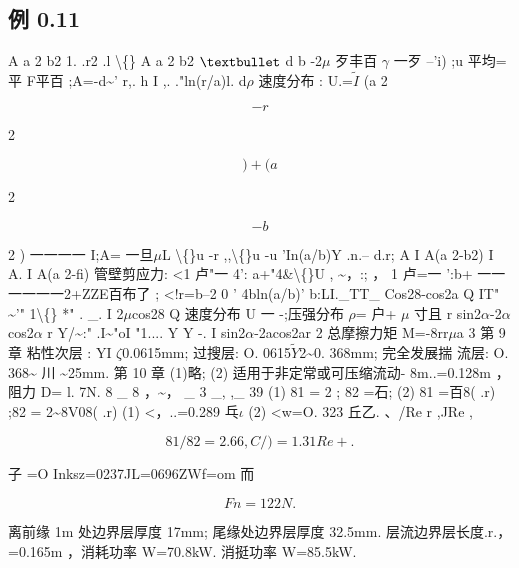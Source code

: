 \subsection*{例 0.11}

A a 2 b2 1. .r2 .l \textbackslash\{\} A a 2 b2 ${\rm •}$ d b -2$\mu$ 歹丰百 $\gamma$ 一歹 --'i) ;u 平均=平 F平百 ;A=-d\textasciitilde{}' r,. h I ,. ."ln(r/a)l. d$\rho$ 速度分布 : U.=$\tilde{I}$ (a 2

\[-r\]

2

\[)+(a\]

2

\[-b\]

2 ) 一一一一 I;A= 一旦$\mu$L \textbackslash\{\}u -r ,,\textbackslash\{\}u -u 'In(a/b)Y .n.-- d.r; A I A(a 2-b2) I A. I A(a 2-fi) 管壁剪应力: <1 卢"一 4': a+"4\&\textbackslash\{\}U , \textasciitilde{}，:; ， 1 卢=一 ':b+ 一一一一一一2+ZZE百布了 ; <!r=b--2 0 ' 4bln(a/b)' b:LI.\_TT\_ Cos28-cos2a Q IT" \textasciitilde{}'" 1\textbackslash\{\} *" . \_. I 2$\mu$cos28 Q 速度分布 U 一 -;压强分布 $\rho$= 户+ $\mu$ 寸且 r sin2$\alpha$-2$\alpha$cos2$\alpha$ r Y/\textasciitilde{}:" .I\textasciitilde{}"oI "1.... Y Y -. I sin2$\alpha$-2acos2ar 2 总摩擦力矩 M=-8rr$\mu$a 3 第 9 章 粘性次层 : YI $\zeta$0.0615mm; 过搜层: O. 0615$\tilde{Y}$2\textasciitilde{}0. 368mm; 完全发展揣 流层: O. 368\textasciitilde{} 川 \textasciitilde{}25mm. 第 10 章 (1)略; (2) 适用于非定常或可压缩流动- 8m..=0.128m ，阻力 D= l. 7N. 8 \_ 8 ，\textasciitilde{}， \_ 3 \_, ,\_ 39 (1) 81 = 2 ; 82 =石; (2) 81 =百8( .r) ;82 = 2\textasciitilde{}8V08( .r) (1) <，..=0.289 乓$\iota$ (2) <w=O. 323 丘乙. 、/Re r ,JRe ,

\[81 /82=2.66 , C/)= 1. 31Re +.\]

子 =O Inksz=0237JL=0696ZWf=om 而

\[Fn =122N.\]

离前缘 1m 处边界层厚度 17mm; 尾缘处边界层厚度 32.5mm. 层流边界层长度.r.， =0.165m ，消耗功率 W=70.8kW. 消挺功率 W=85.5kW.
